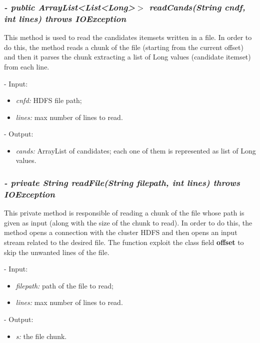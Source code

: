 \documentclass[]{report}
\begin{document}
	\subsubsection*{\textit{\textbf{-} public ArrayList<List<Long>$>$ readCands(String cndf, int lines) throws IOException}}   	
	This method is used to read the candidates itemsets written in a file. In order to do this, the method reads a chunk of the file (starting from the current offset) and then it parses the chunk extracting a list of Long values (candidate itemset) from each line. 
	\begin{description}
		\item - Input:
		\begin{itemize}
			\item \textit{cnfd:} HDFS file path;
			\item \textit{lines:} max number of lines to read. 
		\end{itemize}
	\end{description}
	\begin{description}
		\item - Output:
		\begin{itemize}
			\item \textit{cands:} ArrayList of candidates; each one of them is represented as list of Long values. 
		\end{itemize}
	\end{description}


	\subsubsection*{\textit{\textbf{-} private String readFile(String filepath, int lines) throws IOException}}   	
	This private method is responsible of reading a chunk of the file whose path is given as input (along with the size of the chunk to read). In order to do this, the method opens a connection with the cluster HDFS and then opens an input stream related to the desired file. The function exploit the class field \textbf{offset} to skip the unwanted lines of the file.    
	\begin{description}
		\item - Input:
		\begin{itemize}
			\item \textit{filepath:} path of the file to read;
			\item \textit{lines:} max number of lines to read.
		\end{itemize}
	\end{description}
	\begin{description}
		\item - Output:
		\begin{itemize}
			\item \textit{s:} the file chunk. 
		\end{itemize}
	\end{description}
\end{document}

